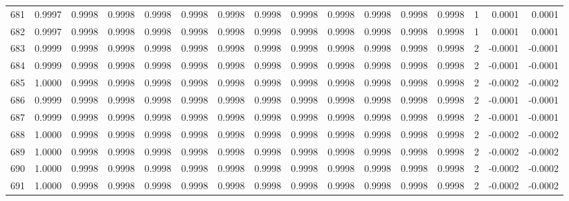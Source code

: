 \begin{tabular}{lrrrrrrrrrrrrrrr}
681 &      0.9997 &  0.9998 &  0.9998 &  0.9998 &  0.9998 &  0.9998 &  0.9998 &  0.9998 &  0.9998 &  0.9998 &   0.9998 &     0.9998 &      1 &                    0.0001 &                     0.0001 \\
682 &      0.9997 &  0.9998 &  0.9998 &  0.9998 &  0.9998 &  0.9998 &  0.9998 &  0.9998 &  0.9998 &  0.9998 &   0.9998 &     0.9998 &      1 &                    0.0001 &                     0.0001 \\
683 &      0.9999 &  0.9998 &  0.9998 &  0.9998 &  0.9998 &  0.9998 &  0.9998 &  0.9998 &  0.9998 &  0.9998 &   0.9998 &     0.9998 &      2 &                   -0.0001 &                    -0.0001 \\
684 &      0.9999 &  0.9998 &  0.9998 &  0.9998 &  0.9998 &  0.9998 &  0.9998 &  0.9998 &  0.9998 &  0.9998 &   0.9998 &     0.9998 &      2 &                   -0.0001 &                    -0.0001 \\
685 &      1.0000 &  0.9998 &  0.9998 &  0.9998 &  0.9998 &  0.9998 &  0.9998 &  0.9998 &  0.9998 &  0.9998 &   0.9998 &     0.9998 &      2 &                   -0.0002 &                    -0.0002 \\
686 &      0.9999 &  0.9998 &  0.9998 &  0.9998 &  0.9998 &  0.9998 &  0.9998 &  0.9998 &  0.9998 &  0.9998 &   0.9998 &     0.9998 &      2 &                   -0.0001 &                    -0.0001 \\
687 &      0.9999 &  0.9998 &  0.9998 &  0.9998 &  0.9998 &  0.9998 &  0.9998 &  0.9998 &  0.9998 &  0.9998 &   0.9998 &     0.9998 &      2 &                   -0.0001 &                    -0.0001 \\
688 &      1.0000 &  0.9998 &  0.9998 &  0.9998 &  0.9998 &  0.9998 &  0.9998 &  0.9998 &  0.9998 &  0.9998 &   0.9998 &     0.9998 &      2 &                   -0.0002 &                    -0.0002 \\
689 &      1.0000 &  0.9998 &  0.9998 &  0.9998 &  0.9998 &  0.9998 &  0.9998 &  0.9998 &  0.9998 &  0.9998 &   0.9998 &     0.9998 &      2 &                   -0.0002 &                    -0.0002 \\
690 &      1.0000 &  0.9998 &  0.9998 &  0.9998 &  0.9998 &  0.9998 &  0.9998 &  0.9998 &  0.9998 &  0.9998 &   0.9998 &     0.9998 &      2 &                   -0.0002 &                    -0.0002 \\
691 &      1.0000 &  0.9998 &  0.9998 &  0.9998 &  0.9998 &  0.9998 &  0.9998 &  0.9998 &  0.9998 &  0.9998 &   0.9998 &     0.9998 &      2 &                   -0.0002 &                    -0.0002 \\

\end{tabular}
